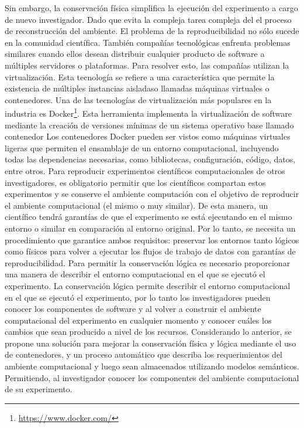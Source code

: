 Sin embargo, la conservación física simplifica la ejecución del experimento a cargo de nuevo investigador. Dado que evita la compleja tarea compleja del el proceso de reconstrucción del ambiente.
El problema de la reproducibilidad no sólo sucede en la comunidad científica. También compañías tecnológicas enfrenta problemas similares cuando ellos desean distribuir cualquier producto de software a múltiples servidores o plataformas.
Para resolver esto, las compañías utilizan la virtualización. Esta tecnología se refiere a una característica que permite la existencia de múltiples instancias aisladaso llamadas máquinas virtuales o contenedores.
Una de las tecnologías de virtualización más populares en la industria es Docker\footnote{\url{https://www.docker.com/}}. 
Esta herramienta implementa la virtualización de software mediante la creación de versiones mínimas de un sistema operativo base llamado contenedor
Los contenedores Docker pueden ser vistos como máquinas virtuales ligeras que permiten el ensamblaje de un entorno computacional, incluyendo todas las dependencias necesarias, como bibliotecas, configuración, código, datos, entre otros.
Para reproducir experimentos científicos computacionales de otros investigadores, es obligatorio permitir que los científicos compartan estos experimentos y se conserve el ambiente computación con el objetivo de reproducir el ambiente computacional  (el mismo o muy similar).
De esta manera, un científico tendrá garantías de que el experimento se está ejecutando en el mismo entorno o similar en comparación al entorno original.
Por lo tanto, se necesita un procedimiento que garantice ambos requisitos: preservar los entornos tanto lógicos como físicos para volver a ejecutar los flujos de trabajo de datos con garantías de reproducibilidad.
Para permitir la conservación lógica es necesario proporcionar una manera de describir el entorno computacional en el que se ejecutó el experimento. 
La conservación lógica permite describir el entorno computacional en el que se ejecutó el experimento, por lo tanto los investigadores pueden conocer los componentes de software y al volver a construir el ambiente computacional del experimento en cualquier momento y conocer cuáles los cambios que sean producido a nivel de los recursos.
Considerando lo anterior, se propone una solución para mejorar la conservación física y lógica mediante el uso de contenedores, y un proceso automático que describa los requerimientos del ambiente computacional y luego sean almacenados utilizando modelos semánticos. Permitiendo, al investigador conocer los componentes del ambiente computacional de su experimento.
